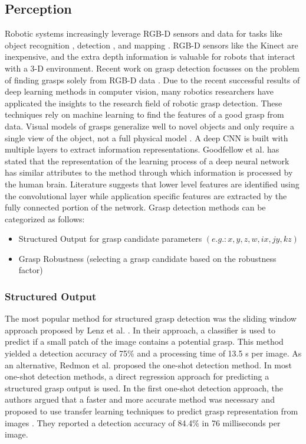 \documentclass[a4paper]{article}
\begin{document}
\subsection{Perception}
\label{3_1subsec_perception}
Robotic systems increasingly leverage RGB-D sensors and data for tasks like object recognition \cite{8_lai2011large}, detection \cite{9_lai2012detection}, and mapping \cite{11_du2011rgb}. 
RGB-D sensors like the Kinect are inexpensive, and the extra depth information is valuable for robots that interact with a 3-D environment.
Recent work on grasp detection focusses on the problem of finding grasps solely from RGB-D data \cite{13_saxena2008robotic}. 
Due to the recent successful results of deep learning methods in computer vision, many robotics researchers have applicated the insights to the research field of robotic grasp detection.
These techniques rely on machine learning to find the features of a good grasp from data. 
Visual models of grasps generalize well to novel objects and only require a single view of the object, not a full physical model \cite{18_erhan2014scalable}.
A deep CNN is built with multiple layers to extract information representations.
Goodfellow et al. \cite{goodfellow2016deep} has stated that the representation of the learning process of a deep neural network has similar attributes to the method through which information is processed by the human brain. 
Literature suggests that lower level features are identified using the convolutional layer while application specific features are extracted by the fully connected portion of the network.
Grasp detection methods can be categorized as follows:
\begin{itemize}
    \item Structured Output for grasp candidate parameters $(e.g.: x, y, z, w, ix, jy, kz)$
    \item Grasp Robustness (selecting a grasp candidate based on the robustness factor)
\end{itemize}

\subsubsection{Structured Output}
The most popular method for structured grasp detection was the sliding window approach proposed by Lenz et al. \cite{18_erhan2014scalable}. 
In their approach, a classifier is used to predict if a small patch of the image contains a potential grasp.
This method yielded a detection accuracy of 75\% and a processing time of 13.5 s per image.
As an alternative, Redmon et al. \cite{19_redmon2015real} proposed the one-shot detection method.
In most one-shot detection methods, a direct regression approach for predicting a structured grasp output is used. 
In the first one-shot detection approach, the authors argued that a faster and more accurate method was necessary and proposed to use transfer learning techniques to predict grasp representation from images \cite{19_redmon2015real}. 
They reported a detection accuracy of 84.4\% in 76 milliseconds per image.
\end{document}
